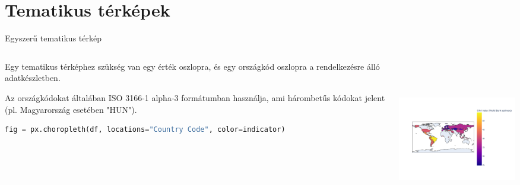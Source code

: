 \documentclass[english, aspectratio=169]{beamer}
\makeatletter
\let\origtableofcontents=\tableofcontents
\def\tableofcontents{\@ifnextchar[{\origtableofcontents}{\gobbletableofcontents}}
\def\gobbletableofcontents#1{\origtableofcontents}
\makeatother
\begin{document}
\section{Tematikus térképek}

\begin{frame}{}
	\tableofcontents[currentsection]
\end{frame}

\begin{frame}[fragile]{Egyszerű tematikus térkép}
	\begin{columns}
		\begin{column}{.5\textwidth}
			Egy tematikus térképhez szükség van egy érték oszlopra, és egy országkód oszlopra a rendelkezésre álló adatkészletben.\par\smallskip
			Az országkódokat általában ISO 3166-1 alpha-3 formátumban használja, ami hárombetűs kódokat jelent (pl. Magyarország esetében "HUN").\par\smallskip
			\begin{lstlisting}[language=python]
fig = px.choropleth(df, locations="Country Code", color=indicator)				
			\end{lstlisting}
		\end{column}
		\begin{column}{.5\textwidth}
			\begin{center}
				\includegraphics[width=7cm, height=7cm, keepaspectratio]{images/scatter_20.png}
			\end{center}
		\end{column}
	\end{columns}
\end{frame}
\end{document}
